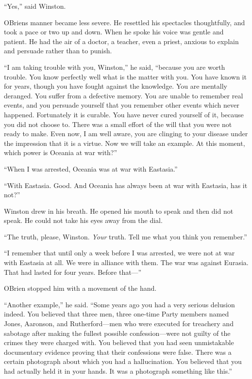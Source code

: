 ``Yes,'' said Winston.

O\textquotesingle Brien\textquotesingle s manner became less severe. He
resettled his spectacles thoughtfully, and took a pace or two up and
down. When he spoke his voice was gentle and patient. He had the air of
a doctor, a teacher, even a priest, anxious to explain and persuade
rather than to punish.

``I am taking trouble with you, Winston,'' he said, ``because you are worth
trouble. You know perfectly well what is the matter with you. You have
known it for years, though you have fought against the knowledge. You
are mentally deranged. You suffer from a defective memory. You are
unable to remember real events, and you persuade yourself that you
remember other events which never happened. Fortunately it is curable.
You have never cured yourself of it, because you did not choose to.
There was a small effort of the will that you were not ready to make.
Even now, I am well aware, you are clinging to your disease under the
impression that it is a virtue. Now we will take an example. At this
moment, which power is Oceania at war with?''

``When I was arrested, Oceania was at war with Eastasia.''

``With Eastasia. Good. And Oceania has always been at war with Eastasia,
has it not?''

Winston drew in his breath. He opened his mouth to speak and then did
not speak. He could not take his eyes away from the dial.

``The truth, please, Winston. \emph{Your} truth. Tell me what you think
you remember.''

``I remember that until only a week before I was arrested, we were not at
war with Eastasia at all. We were in alliance with them. The war was
against Eurasia. That had lasted for four years. Before that---''

O\textquotesingle Brien stopped him with a movement of the hand.

``Another example,'' he said. ``Some years ago you had a very serious
delusion indeed. You believed that three men, three one-time Party
members named Jones, Aaronson, and Rutherford---men who were executed
for treachery and sabotage after making the fullest possible
confession---were not guilty of the crimes they were charged with. You
believed that you had seen unmistakable documentary evidence proving
that their confessions were false. There was a certain photograph about
which you had a hallucination. You believed that you had actually held
it in your hands. It was a photograph something like this.''


